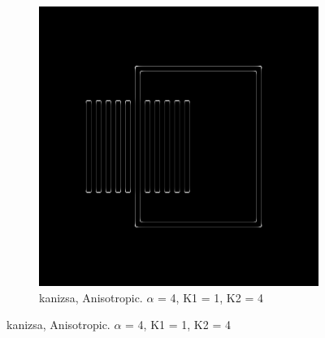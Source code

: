 \begin{figure}[H]
\centering 
  \begin{subfigure}{.7\textwidth}
    \centering
    \includegraphics[width=.9\textwidth]{./canny/kanizsa_ANISO_a4_k11_k24}
    \caption{kanizsa, Anisotropic. $\alpha$ = 4, K1 = 1, K2 = 4}
    \label{fig:kanizsa_ANISO_a4_k11_k24}
  \end{subfigure}%
  
\end{figure}